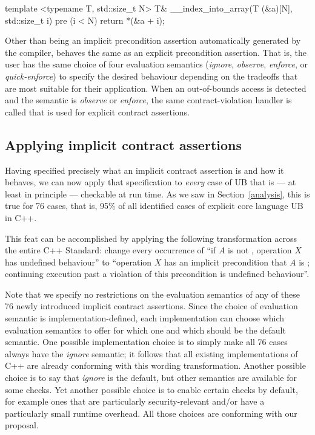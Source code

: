 \begin{codeblock}
template <typename T, std::size_t N>
T& __index_into_array(T (&a)[N], std::size_t i) 
pre (i < N) {
  return *(&a + i);
}
\end{codeblock}

Other than being an implicit precondition assertion automatically generated by the compiler, \mbox{} behaves the same as an explicit precondition assertion. That is, the user has the same choice of four evaluation semantics (\emph{ignore}, \emph{observe}, \emph{enforce}, or \emph{quick-enforce}) to specify the desired behaviour depending on the tradeoffs that are most suitable for their application. When an out-of-bounds access is detected and the semantic is \emph{observe} or \emph{enforce}, the same contract-violation handler is called that is used for explicit contract assertions.

\subsection{Applying implicit contract assertions}
\label{applyicas}

Having specified precisely what an implicit contract assertion is and how it behaves, we can now apply that specification to \emph{every} case of UB  that is --- at least in principle --- checkable at run time. As we saw in Section~\ref{analysis}, this is true for 76 cases, that is, 95\% of all identified cases of explicit core language UB in C++.

This feat can be accomplished by applying the following transformation across the entire C++ Standard: change every occurrence of “if $A$ is not , operation $X$ has undefined behaviour'' to ``operation $X$ has an implicit precondition that $A$ is ; continuing execution past a violation of this precondition is undefined behaviour''.

Note that we specify no restrictions on the evaluation semantics of any of these 76 newly introduced  implicit contract assertions. Since the choice of evaluation semantic is implementation-defined, each implementation can choose which evaluation semantics to offer for which one and which should be the default semantic. One possible implementation choice is to simply make all 76 cases always have the \emph{ignore} semantic; it follows that all existing implementations of C++ are already conforming with this wording transformation. Another possible choice is to say that  \emph{ignore} is the default, but other semantics are available for some checks. Yet another possible choice is to enable certain checks by default, for example ones that are particularly security-relevant and/or have a particularly small runtime overhead. All those choices are conforming with our proposal.

